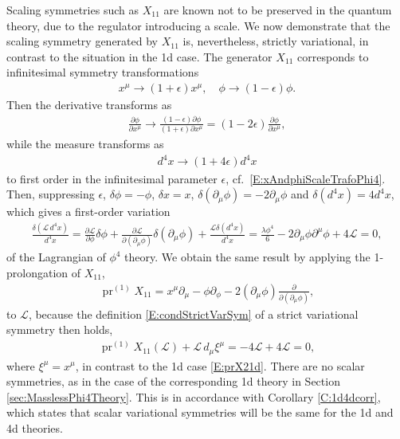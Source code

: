 \documentclass[a4paper,hidelinks, 12pt]{article}
\numberwithin{equation}{section}
\theoremstyle{plain}
\newcommand{\mc}{\mathcal}
\begin{document}
Scaling symmetries such as $X_{11}$ are known not to be preserved in the quantum theory, due to the regulator introducing a scale. 
We now demonstrate that the scaling symmetry generated by $X_{11}$ is, nevertheless, strictly variational, in contrast to the situation in the 1d case. The generator $X_{11}$ corresponds to infinitesimal symmetry transformations
\begin{align}\label{E:xAndphiScaleTrafoPhi4}
	x^\mu\to (1+\epsilon)x^\mu, \quad \phi\to (1-\epsilon)\phi.  
\end{align}
Then the derivative transforms as 
\begin{align}
	\frac{\partial \phi}{\partial x^\mu}\to \frac{(1-\epsilon)\partial \phi}{(1+\epsilon)\partial x^\mu}=(1-2\epsilon)\frac{\partial \phi}{\partial x^\mu},
\end{align}
while the measure transforms as
\begin{align}
	d^4x\to (1+4\epsilon)d^4x
\end{align}
to first order in the infinitesimal parameter $\epsilon$, cf.~\eqref{E:xAndphiScaleTrafoPhi4}.
Then, suppressing $\epsilon$, $\delta \phi =-\phi$, $\delta x= x$,
$\delta ({\partial_\mu \phi})= -2{\partial_\mu \phi}$ and $\delta (d^4x)=4d^4x$, which gives a first-order variation 
\begin{align}
	\frac{\delta (\mc{L}\, d^4x)}{d^4x}= \frac{\partial \mc{L}}{\partial \phi}\delta \phi+
	\frac{\partial \mc{L}}{\partial (\partial_\mu \phi)}\delta ({\partial_\mu \phi})+\frac{\mc{L}\delta (d^4x)}{d^4x}
	=\frac{\lambda \phi^4}{6}-2\partial_\mu \phi \partial^\mu \phi+4\mc{L}=0,
\end{align}
of the Lagrangian of $\phi^4$ theory.
We obtain the same result by applying the 1-prolongation of $X_{11}$, 
\begin{align}
	\operatorname{pr}^{(1)}X_{11}=x^\mu \partial_\mu-\phi \partial_\phi
	-2(\partial_\mu \phi) \frac{\partial}{\partial(\partial_\mu \phi)},
\end{align}
to $\mc{L}$, because the definition \eqref{E:condStrictVarSym} of a strict variational symmetry then holds, 
\begin{align}\label{E:strictVarSymX11}
	\operatorname{pr}^{(1)}X_{11}(\mc{L})+\mc{L}\, d_\mu\xi^\mu=-4\mc{L}+4\mc{L}=0,
\end{align}
where $\xi^\mu=x^\mu$, in contrast to the 1d case \eqref{E:prX21d}. There are no scalar symmetries, as in the case of the corresponding 1d theory in Section \ref{sec:MasslessPhi4Theory}. This is in accordance with Corollary \ref{C:1d4dcorr}, which states that scalar variational symmetries will be the same for the 1d and 4d theories.
\end{document}
